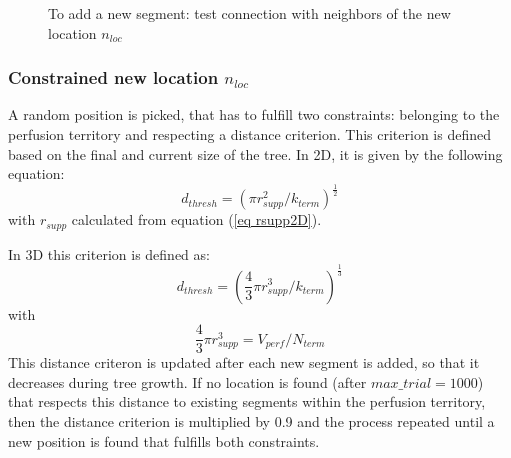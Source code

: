 \documentclass[a4paper, 11pt]{article} %
\begin{document}

\begin{figure}[!h]
\centering
{}
\caption{To add a new segment: test connection with neighbors of the new location $n_{loc}$}
\label{fig:test neighbors}
\end{figure}

\subsubsection{Constrained new location $n_{loc}$}
A random position is picked, that has to fulfill two constraints: belonging to the perfusion territory and respecting a distance criterion. 
This criterion is defined based on the final and current size of the tree. In 2D, it is given by the following equation:
\begin{equation}
d_{thresh} = (\pi r_{supp}^2 / k_{term})^\frac{1}{2}
\end{equation}
with $r_{supp}$ calculated from equation (\ref{eq rsupp2D}).%

In 3D this criterion is defined as:
\begin{equation}
d_{thresh} = (\frac{4}{3} \pi r_{supp}^3 / k_{term})^\frac{1}{3}
\end{equation}
with
\begin{equation}
\frac{4}{3}\pi r_{supp}^3 = V_{perf} / N_{term}
\end{equation}
This distance criteron is updated after each new segment is added, so that it decreases during tree growth. If no location is found (after $max\_trial = 1000$) that respects this distance to existing segments within the perfusion territory, then the distance criterion is multiplied by 0.9 and the process repeated until a new position is found that fulfills both constraints. 
\end{document}
